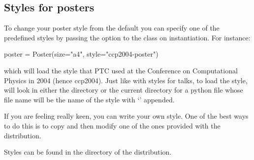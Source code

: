\subsection{Styles for posters}
\label{sec:poster-styles}

To change your poster style from the default you can specify one of the
predefined styles by passing the  option to the 
class on instantiation.  For instance:
\begin{python}
poster = Poster(size="a4", style="ccp2004-poster")
\end{python}
which will load the style that PTC used at the Conference on Computational
Physics in 2004 (hence ccp2004).  Just like with styles for talks, to load
the style, \pyscript will look in either the 
directory or the current directory for a python file whose file name will be
the name of the style with `' appended.

If you are feeling really keen, you can write your own style.  One of the
best ways to do this is to copy and then modify one of the ones provided
with the \pyscript distribution.

Styles can be found in the  directory of the \pyscript
distribution.
